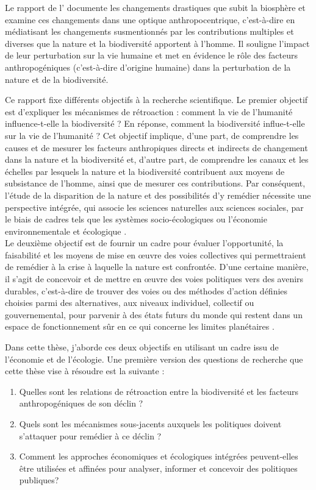 Le rapport de l'\cite{ipbes_2022_6417333} documente les changements drastiques que subit la biosphère et examine ces changements dans une optique anthropocentrique, c'est-à-dire en médiatisant les changements susmentionnés par les contributions multiples et diverses que la nature et la biodiversité apportent à l'homme. Il souligne l'impact de leur perturbation sur la vie humaine et met en évidence le rôle des facteurs anthropogéniques (c'est-à-dire d'origine humaine) dans la perturbation de la nature et de la biodiversité. 
 
Ce rapport fixe différents objectifs à la recherche scientifique. Le premier objectif est d'expliquer les mécanismes de rétroaction : comment la vie de l'humanité influence-t-elle la biodiversité ? En réponse, comment la biodiversité influe-t-elle sur la vie de l'humanité ? Cet objectif implique, d'une part, de comprendre les causes et de mesurer les facteurs anthropiques directs et indirects de changement dans la nature et la biodiversité et, d'autre part, de comprendre les canaux et les échelles par lesquels la nature et la biodiversité contribuent aux moyens de subsistance de l'homme, ainsi que de mesurer ces contributions. Par conséquent, l'étude de la disparition de la nature et des possibilités d'y remédier nécessite une perspective intégrée, qui associe les sciences naturelles aux sciences sociales, par le biais de cadres tels que les systèmes socio-écologiques \citep{Ostrom2009} ou l'économie environnementale et écologique \citep{daly_ecological_2007}. 
\\
Le deuxième objectif est de fournir un cadre pour évaluer l'opportunité, la faisabilité et les moyens de mise en œuvre des voies collectives qui permettraient de remédier à la crise à laquelle la nature est confrontée. D'une certaine manière, il s'agit de concevoir et de mettre en œuvre des voies politiques vers des avenirs durables, c'est-à-dire de trouver des voies ou des méthodes d'action définies choisies parmi des alternatives, aux niveaux individuel, collectif ou gouvernemental, pour parvenir à des états futurs du monde qui restent dans un espace de fonctionnement sûr en ce qui concerne les limites planétaires \citep{rockstrom2009safe,steffen_2015_planetary}.

Dans cette thèse, j'aborde ces deux objectifs en utilisant un cadre issu de l'économie et de l'écologie. Une première version des questions de recherche que cette thèse vise à résoudre est la suivante : 

\begin{enumerate}
\item Quelles sont les relations de rétroaction entre la biodiversité et les facteurs anthropogéniques de son déclin ?
\item Quels sont les mécanismes sous-jacents auxquels les politiques doivent s'attaquer pour remédier à ce déclin ?
\item Comment les approches économiques et écologiques intégrées peuvent-elles être utilisées et affinées pour analyser, informer et concevoir des politiques publiques? 
\end{enumerate}

